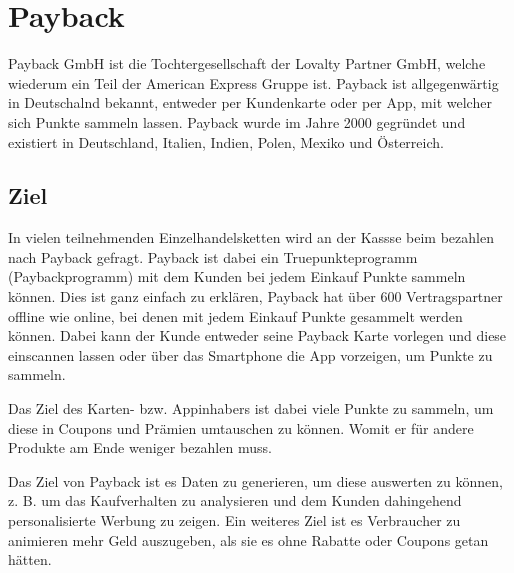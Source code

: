 \section{Payback} \label{Payback}
Payback GmbH ist die Tochtergesellschaft der Lovalty Partner GmbH, welche wiederum ein Teil der American Express Gruppe ist. \cite{Payback_Info} Payback ist allgegenwärtig in Deutschalnd bekannt, entweder per Kundenkarte oder per App, mit welcher sich Punkte sammeln lassen. \newline
\noindent Payback wurde im Jahre 2000 gegründet und existiert in Deutschland, Italien, Indien, Polen, Mexiko und Österreich. \cite{Payback_Info} \newline

\subsection{Ziel}
In vielen teilnehmenden Einzelhandelsketten wird an der Kassse beim bezahlen nach Payback gefragt. Payback ist dabei ein Truepunkteprogramm (Paybackprogramm) mit dem Kunden bei jedem Einkauf Punkte sammeln können. Dies ist ganz einfach zu erklären, Payback hat über 600 Vertragspartner offline wie online, bei denen mit jedem Einkauf Punkte gesammelt werden können. Dabei kann der Kunde entweder seine Payback Karte vorlegen und diese einscannen lassen oder über das Smartphone die App vorzeigen, um Punkte zu sammeln. \cite{Payback} \newline

\noindent Das Ziel des Karten- bzw. Appinhabers ist dabei viele Punkte zu sammeln, um diese in Coupons und Prämien umtauschen zu können. Womit er für andere Produkte am Ende weniger bezahlen muss. \newline

\noindent Das Ziel von Payback ist es Daten zu generieren, um diese auswerten zu können, z. B. um das Kaufverhalten zu analysieren und dem Kunden dahingehend personalisierte Werbung zu zeigen. Ein weiteres Ziel ist es Verbraucher zu animieren mehr Geld auszugeben, als sie es ohne Rabatte oder Coupons getan hätten. \cite{web}


